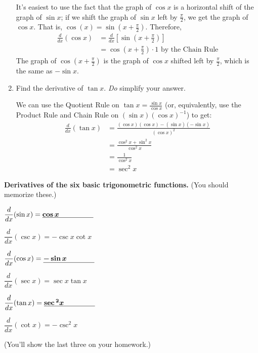 \documentclass[main]{subfiles}
\begin{document}
\begin{enumerate}[resume]
  \begin{solution}
    It's easiest to use the fact that the graph of $\cos x$ is a
    horizontal shift of the graph of $\sin x$; if we shift the graph of
    $\sin x$ left by $\frac{\pi}{2}$, we get the graph of $\cos x$.  That
    is, $\cos (x) = \sin \left( x + \frac{\pi}{2} \right)$.  Therefore,
    \begin{align*}
      \frac{d}{dx} (\cos x) &= \frac{d}{dx} \left[ \sin \left( x +
          \frac{\pi}{2} \right) \right] \\
      &= \cos \left( x + \frac{\pi}{2} \right) \cdot 1 \text{ by the Chain
        Rule} 
    \end{align*}
    The graph of $\cos \left( x + \frac{\pi}{2} \right)$ is the graph of
    $\cos x$ shifted left by $\frac{\pi}{2}$, which is the same as
    $\boxed{-\sin x}$. 
  \end{solution}

\item 

  \begin{problem}[\vfill\newpage]
    Find the derivative of $\tan x$.  \emph{Do} simplify your answer.
  \end{problem} 

  \begin{solution}
    We can use the Quotient Rule on $\displaystyle \tan x = \frac{\sin
      x}{\cos x}$ (or, equivalently, use the Product Rule and Chain Rule
    on $(\sin x) (\cos x)^{-1}$) to get:
    \begin{align*}
      \frac{d}{dx} (\tan x) &= \frac{(\cos x)(\cos x) - (\sin x) (-\sin
        x)}{(\cos x)^2} \\
      &= \frac{\cos^2 x + \sin^2 x}{\cos^2 x} \\
      &= \frac{1}{\cos^2 x} \\
      &= \sec^2 x
    \end{align*}
  \end{solution}

\end{enumerate}
  \begin{framed}
    \textbf{Derivatives of the six basic trigonometric functions.}  (You
    should memorize these.)

    \begin{multicols}{3}
    
      $\dfrac{d}{dx} (\sin x) = \fitb{1in}{\cos x}$

      $\dfrac{d}{dx} (\csc x) = - \csc x \cot x$

      $\dfrac{d}{dx} (\cos x) = \fitb{1in}{-\sin x}$

      $\dfrac{d}{dx} (\sec x) = \sec x \tan x$

      $\dfrac{d}{dx} (\tan x) = \fitb{1in}{\sec{^2} x}$

      $\dfrac{d}{dx} (\cot x) = -\csc^2 x$
      
    \end{multicols}
    \vspace{-8pt}
    (You'll show the last three on your homework.)
  \end{framed}
\end{document}
